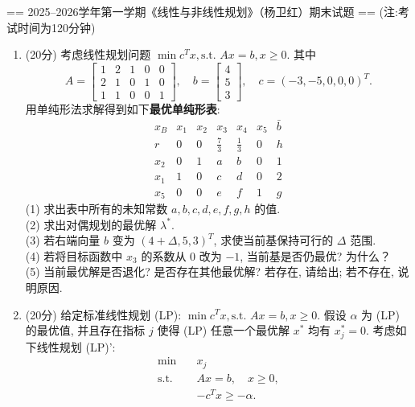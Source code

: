 
== 2025--2026学年第一学期《线性与非线性规划》（杨卫红）期末试题 ==
(注:考试时间为120分钟)
\begin{enumerate}
    \item (20分) 考虑线性规划问题 $\min c^T x, \text{s.t. } Ax = b, x \geq 0$. 其中 $$A = \begin{bmatrix} 1 & 2 & 1 & 0 & 0 \\ 2 & 1 & 0 & 1 & 0 \\ 1 & 1 & 0 & 0 & 1 \end{bmatrix}, \quad b = \begin{bmatrix} 4 \\ 5 \\ 3 \end{bmatrix}, \quad c = (-3, -5, 0, 0, 0)^T.$$ 用单纯形法求解得到如下\textbf{最优单纯形表}: $$\begin{array}{c|ccccc|c} x_B & x_1 & x_2 & x_3 & x_4 & x_5 & \bar{b} \\ \hline r & 0 & 0 & \frac73 & \frac13 & 0 & h \\ \hline x_2 & 0 & 1 & a & b & 0 & 1 \\ x_1 & 1 & 0 & c & d & 0 & 2 \\ x_5 & 0 & 0 & e & f & 1 & g \end{array}$$
    (1) 求出表中所有的未知常数 $a, b, c, d, e, f, g, h$ 的值.\\
    (2) 求出对偶规划的最优解 $\lambda^*$.\\
    (3) 若右端向量 $b$ 变为 $(4+\Delta, 5, 3)^T$, 求使当前基保持可行的 $\Delta$ 范围.\\
    (4) 若将目标函数中 $x_3$ 的系数从 $0$ 改为 $-1$, 当前基是否仍最优? 为什么？\\
    (5) 当前最优解是否退化? 是否存在其他最优解? 若存在, 请给出; 若不存在, 说明原因.
    \item (20分) 给定标准线性规划 (LP): $\min c^Tx, \text{s.t. } Ax=b, x \geq 0$. 假设 $\alpha$ 为 (LP) 的最优值, 并且存在指标 $j$ 使得 (LP) 任意一个最优解 $x^*$ 均有 $x_j^*=0$. 考虑如下线性规划 (LP)': $$\begin{aligned} \min \quad & x_j \\ \text{s.t.} \quad & Ax=b, \quad x\geq 0, \\ &-c^Tx \geq - \alpha. \end{aligned}$$

\end{enumerate}
